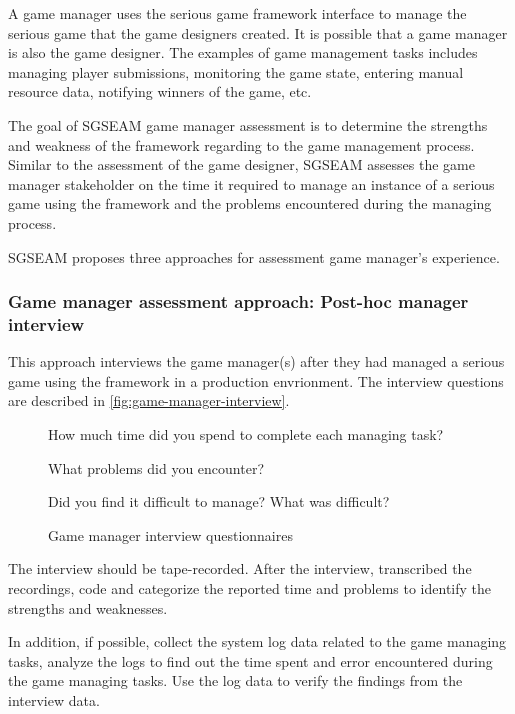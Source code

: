 \documentclass[11pt,oneside]{book}
\begin{document}
A game manager uses the serious game framework interface to manage the serious game that the game
designers created. It is possible that a game manager is also the game designer.
The examples of game management tasks includes managing player submissions, monitoring the game 
state, entering manual resource data, notifying winners of the game, etc.

The goal of SGSEAM game manager assessment is to determine the strengths and weakness of the framework 
regarding to the game management process. Similar to the assessment of the game designer, SGSEAM assesses 
the game manager stakeholder on the time it required to manage an instance of a serious game using the framework
and the problems encountered during the managing process.

SGSEAM proposes three approaches for assessment game manager's experience.

\subsubsection{Game manager assessment approach: Post-hoc manager interview}
\label{Post-hoc game manager interview}

This approach interviews the game manager(s) after they had managed a serious game using the framework 
in a production envrionment. The interview questions are described in \autoref{fig:game-manager-interview}.
 
\begin{figure}[ht!]
\begin{mybox}
\begin{compactenum}
\item How much time did you spend to complete each managing task?
\item What problems did you encounter?
\item Did you find it difficult to manage? What was difficult?
\end{compactenum}
\end{mybox}
\caption{Game manager interview questionnaires}
\label{fig:game-manager-interview}  
\end{figure}

The interview should be tape-recorded. After the interview, transcribed the recordings, code and categorize the reported 
time and problems to identify the strengths and weaknesses.

In addition, if possible, collect the system log data related to the game managing tasks, analyze the logs to find out the time 
spent and error encountered during the game managing tasks. Use the log data to verify the findings from the interview data.
\end{document}

